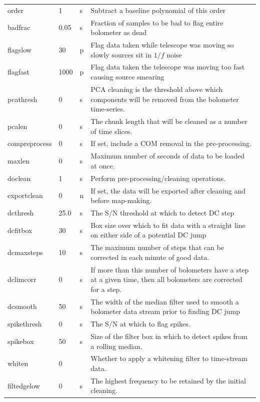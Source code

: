 \documentclass[twoside,11pt]{article}
\renewcommand{\_}{\texttt{\symbol{95}}}
\begin{document}
\begin{htmlonly}
\begin{table}
\begin{center}
\begin{footnotesize}
\begin{tabular}{|p{2.1cm}|p{0.8cm}|p{0.2cm}|p{11.2cm}|}
order & 1 &s &Subtract a baseline polynomial of this order\\
badfrac & 0.05 &s& Fraction of samples to be bad to flag entire bolometer
                        as dead\\
flagslow & 30 & p&Flag data taken while telescope was moving so slowly
                        sources sit in $1/f$ noise\\
flagfast & 1000 &p& Flag data taken the telescope was moving too fast causing source
                        smearing\\
pcathresh & 0 &s& PCA cleaning is the threshold above which components
                        will be removed from the bolometer time-series.\\
pcalen & 0 &s &The chunk length that will be cleaned as a number of time slices.\\
compreprocess& 0 &s& If set, include a COM removal in the pre-processing.\\
maxlen& 0 &s &Maximum number of seconds of data to be loaded at once.\\
doclean& 1 &s&Perform pre-processing/cleaning operations. \\
exportclean& 0 &n&If set, the data will be exported after cleaning and before map-making. \\
dcthresh & 25.0 &s& The S/N threshold at which to detect DC step\\
dcfitbox & 30 &s& Box size over which to fit data with a straight
                        line on either side of a potential DC jump\\
dcmaxsteps & 10 &s& The maximum number of steps that can be corrected
                        in each minute of good data.\\
dclimcorr & 0 &s& If more than this number of bolometers have a step at
                        a given time, then all bolometers are corrected for
                        a step.\\
dcsmooth & 50 &s& The width of the median filter used to smooth a
                        bolometer data stream prior to finding DC jump\\
spikethresh & 0 &s& The S/N at which to flag spikes.\\
spikebox & 50 &s& Size of the filter box in which to detect spikes from a rolling median.\\
whiten & 0 &&Whether to apply a whitening filter to time-stream data. \\
filt\_edgelow & 0 &s&The highest frequency to be retained by the initial cleaning. \\

\end{tabular}
\end{footnotesize}
\end{center}
\end{table}
\end{htmlonly}
\end{document}
